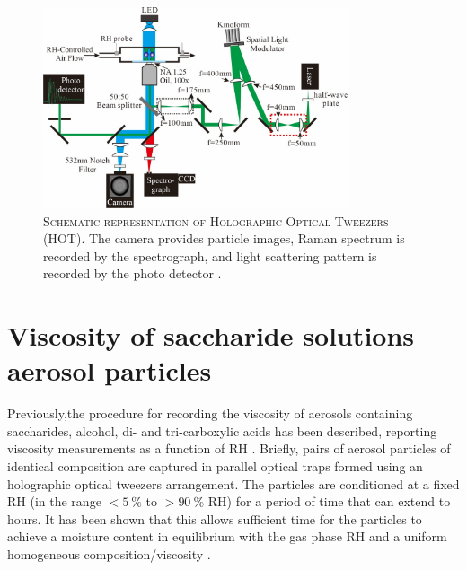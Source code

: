 \begin{figure}
    \centering
    \includegraphics[width=0.8\textwidth]{chapters/water_hopping/figures/image011.jpg}
    \caption[Schematic representation of holographic optical tweezers (HOT)]{\textsc{Schematic representation of Holographic Optical Tweezers (HOT)}. The camera provides particle images, Raman spectrum is recorded by the spectrograph, and light scattering pattern is recorded by the photo detector \cite{Song2016a}.}
    \label{fig:wat_s5}
\end{figure}

\section{Viscosity of saccharide solutions aerosol particles}

Previously,the procedure for recording the viscosity of aerosols containing saccharides, alcohol, di- and tri-carboxylic acids  has been described, reporting viscosity measurements as a function of RH \cite{powerProbingMicrorheologicalProperties2014,Song2016a,powerTransitionLiquidSolidlike2013}. Briefly, pairs of aerosol particles of identical composition are captured in parallel optical traps formed using an holographic optical tweezers arrangement. The particles are conditioned at a fixed RH (in the range $<\SI{5}{\percent}$ to $>\SI{90}{\percent}$ RH) for a period of time that can extend to hours. It has been shown that this allows sufficient time for the particles to achieve a moisture content in equilibrium with the gas phase RH and a uniform homogeneous composition/viscosity \cite{Song2016a}. 

